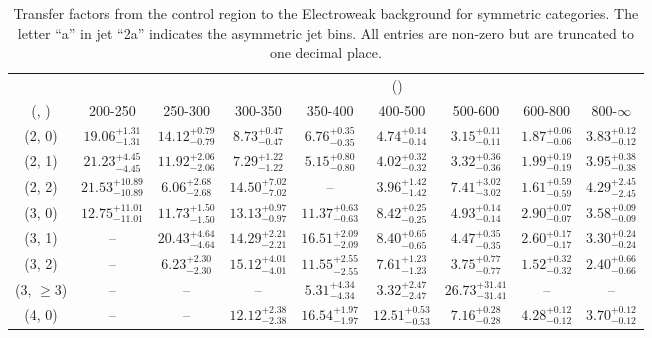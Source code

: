 \begin{table}[h!]
\tiny
\centering
\caption{Transfer factors from the \mmj control region to the Electroweak background for symmetric categories. The letter ``a'' in jet \eg ``2a''  indicates the asymmetric jet bins. All entries are non-zero but are truncated to one decimal place.\label{tab:tf_mumu_total_sym}}
\begin{tabular}
{ccccccccc}
	\hline\hline
&	& \multicolumn{8}{c}{\scalht (\gev)} \\ 
	 (\njet,  \nb) & 200-250 & 250-300 & 300-350 & 350-400 & 400-500 & 500-600 & 600-800 & 800-$\infty$ \\ [0.8ex] 
\hline
	(2, 0) & $19.06^{+ 1.31 }_{- 1.31 }$ & $14.12^{+ 0.79 }_{- 0.79 }$ & $8.73^{+ 0.47 }_{- 0.47 }$ & $6.76^{+ 0.35 }_{- 0.35 }$ & $4.74^{+ 0.14 }_{- 0.14 }$ & $3.15^{+ 0.11 }_{- 0.11 }$ & $1.87^{+ 0.06 }_{- 0.06 }$ & $3.83^{+ 0.12 }_{- 0.12 }$ \\[0.5ex] 
	(2, 1) & $21.23^{+ 4.45 }_{- 4.45 }$ & $11.92^{+ 2.06 }_{- 2.06 }$ & $7.29^{+ 1.22 }_{- 1.22 }$ & $5.15^{+ 0.80 }_{- 0.80 }$ & $4.02^{+ 0.32 }_{- 0.32 }$ & $3.32^{+ 0.36 }_{- 0.36 }$ & $1.99^{+ 0.19 }_{- 0.19 }$ & $3.95^{+ 0.38 }_{- 0.38 }$ \\[0.5ex] 
	(2, 2) & $21.53^{+ 10.89 }_{- 10.89 }$ & $6.06^{+ 2.68 }_{- 2.68 }$ & $14.50^{+ 7.02 }_{- 7.02 }$ & -- & $3.96^{+ 1.42 }_{- 1.42 }$ & $7.41^{+ 3.02 }_{- 3.02 }$ & $1.61^{+ 0.59 }_{- 0.59 }$ & $4.29^{+ 2.45 }_{- 2.45 }$ \\[0.5ex] 
	(3, 0) & $12.75^{+ 11.01 }_{- 11.01 }$ & $11.73^{+ 1.50 }_{- 1.50 }$ & $13.13^{+ 0.97 }_{- 0.97 }$ & $11.37^{+ 0.63 }_{- 0.63 }$ & $8.42^{+ 0.25 }_{- 0.25 }$ & $4.93^{+ 0.14 }_{- 0.14 }$ & $2.90^{+ 0.07 }_{- 0.07 }$ & $3.58^{+ 0.09 }_{- 0.09 }$ \\[0.5ex] 
	(3, 1) & -- & $20.43^{+ 4.64 }_{- 4.64 }$ & $14.29^{+ 2.21 }_{- 2.21 }$ & $16.51^{+ 2.09 }_{- 2.09 }$ & $8.40^{+ 0.65 }_{- 0.65 }$ & $4.47^{+ 0.35 }_{- 0.35 }$ & $2.60^{+ 0.17 }_{- 0.17 }$ & $3.30^{+ 0.24 }_{- 0.24 }$ \\[0.5ex] 
	(3, 2) & -- & $6.23^{+ 2.30 }_{- 2.30 }$ & $15.12^{+ 4.01 }_{- 4.01 }$ & $11.55^{+ 2.55 }_{- 2.55 }$ & $7.61^{+ 1.23 }_{- 1.23 }$ & $3.75^{+ 0.77 }_{- 0.77 }$ & $1.52^{+ 0.32 }_{- 0.32 }$ & $2.40^{+ 0.66 }_{- 0.66 }$ \\[0.5ex] 
	(3, $\ge3$) & -- & -- & -- & $5.31^{+ 4.34 }_{- 4.34 }$ & $3.32^{+ 2.47 }_{- 2.47 }$ & $26.73^{+ 31.41 }_{- 31.41 }$ & -- & -- \\[0.5ex] 
	(4, 0) & -- & -- & $12.12^{+ 2.38 }_{- 2.38 }$ & $16.54^{+ 1.97 }_{- 1.97 }$ & $12.51^{+ 0.53 }_{- 0.53 }$ & $7.16^{+ 0.28 }_{- 0.28 }$ & $4.28^{+ 0.12 }_{- 0.12 }$ & $3.70^{+ 0.12 }_{- 0.12 }$ \\[0.5ex] 

\end{tabular}
\end{table}
